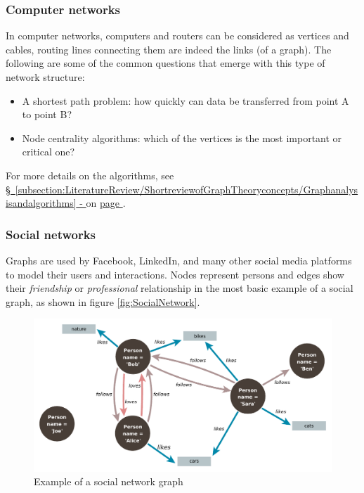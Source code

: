 \subsubsection{Computer networks} \label{subsubsection:LiteratureReview/ShortreviewofGraphTheoryconcepts/Graphexamples/Computernetworks}
In computer networks, computers and routers can be considered as vertices and cables, routing lines connecting them are indeed the links (of a graph).
The following are some of the common questions that emerge with this type of network structure:
 \begin{itemize}[noitemsep]
	\item A shortest path problem:
	how quickly can data be transferred from point A to point B?
	\item Node centrality algorithms: which of the vertices is the most important or critical one?
\end{itemize}
For more details on the algorithms, see \hyperref[subsection:LiteratureReview/ShortreviewofGraphTheoryconcepts/Graphanalysisandalgorithms]{\S\ \ref{subsection:LiteratureReview/ShortreviewofGraphTheoryconcepts/Graphanalysisandalgorithms} - } on \hyperref[subsection:LiteratureReview/ShortreviewofGraphTheoryconcepts/Graphanalysisandalgorithms]{page \pageref{subsection:LiteratureReview/ShortreviewofGraphTheoryconcepts/Graphanalysisandalgorithms}}. 

\subsubsection{Social networks} \label{subsubsection:LiteratureReview/ShortreviewofGraphTheoryconcepts/Graphexamples/Socialnetworks}
Graphs are used by \gls{Facebook}, \gls{LinkedIn}, and many other social media platforms to model their users and interactions.
Nodes represent persons and edges show their \textit{friendship} or \textit{professional} relationship in the most basic example of a social graph, as shown in figure \hyperref[fig:SocialNetwork]{\autoref{fig:SocialNetwork}}.

\begin{figure}[H]%
	\centering%
	\includegraphics[width=1\textwidth]{images/chapter2/SocialNetwork.pdf}%
	\caption[Example of a social network graph]{Example of a social network graph}%
	\label{fig:SocialNetwork}%
\end{figure}%

